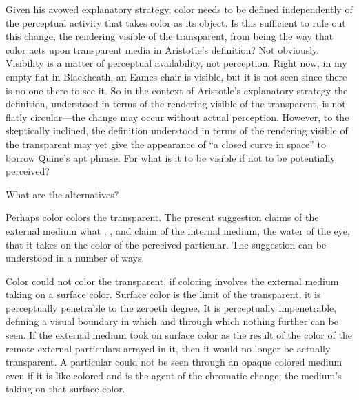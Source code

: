 Given his avowed explanatory strategy, color needs to be defined independently of the perceptual activity that takes color as its object. Is this sufficient to rule out this change, the rendering visible of the transparent, from being the way that color acts upon transparent media in Aristotle's definition? Not obviously. Visibility is a matter of perceptual availability, not perception. Right now, in my empty flat in Blackheath, an Eames chair is visible, but it is not seen since there is no one there to see it. So in the context of Aristotle's explanatory strategy the definition, understood in terms of the rendering visible of the transparent, is not flatly circular---the change may occur without actual perception. However, to the skeptically inclined, the definition understood in terms of the rendering visible of the transparent may yet give the appearance of ``a closed curve in space'' to borrow Quine's \citeyearpar{Quine:1951fk} apt phrase. For what is it to be visible if not to be potentially perceived?

What are the alternatives? 

Perhaps color colors the transparent. The present suggestion claims of the external medium what \citet{Slakey:1961ss}, \citet{Sorabji:1974fk}, and \citet{Everson:1997ep} claim of the internal medium, the water of the eye, that it takes on the color of the perceived particular. The suggestion can be understood in a number of ways. 

Color could not color the transparent, if coloring involves the external me\-di\-um taking on a surface color. Surface color is the limit of the transparent, it is perceptually penetrable to the zeroeth degree. It is perceptually impenetrable, defining a visual boundary in which and  through which nothing further can be seen. If the external medium took on surface color as the result of the color of the remote external particulars arrayed in it, then it would no longer be actually transparent. A particular could not be seen through an opaque colored medium even if it is like-colored and is the agent of the chromatic change, the medium's taking on that surface color. 

